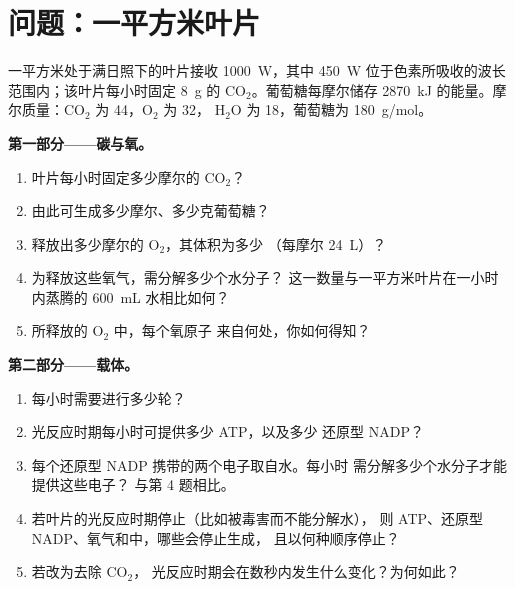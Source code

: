 \section{问题：一平方米叶片}

\begin{problem}
\label{pb:g12:photosynthesis:1}
一平方米处于满日照下的叶片接收 \qty{1000}{W}，其中
\qty{450}{W} 位于色素所吸收的波长范围内；该叶片每小时固定
\qty{8}{g} 的 $\mathrm{CO_2}$。葡萄糖每摩尔储存
\qty{2870}{kJ} 的能量。摩尔质量：$\mathrm{CO_2}$ 为 44，$\mathrm{O_2}$ 为 32，
$\mathrm{H_2O}$ 为 18，葡萄糖为 \qty{180}{g/mol}。

\medskip
\noindent\textbf{第一部分——碳与氧。}
\begin{enumerate}
  \item 叶片每小时固定多少摩尔的 $\mathrm{CO_2}$？
  \item 由此可生成多少摩尔、多少克葡萄糖？
  \item 释放出多少摩尔的 $\mathrm{O_2}$，其体积为多少
        （每摩尔 \qty{24}{L}）？
  \item 为释放这些氧气，需分解多少个水分子？
        这一数量与一平方米叶片在一小时内蒸腾的
        \qty{600}{mL} 水相比如何？
  \item 所释放的 $\mathrm{O_2}$ 中，每个氧原子
        来自何处，你如何得知？
\end{enumerate}

\medskip
\noindent\textbf{第二部分——载体。}
\begin{enumerate}[resume]
  \item 每小时需要进行多少轮？
  \item 光反应时期每小时可提供多少 ATP，以及多少
        还原型 NADP？
  \item 每个还原型 NADP 携带的两个电子取自水。每小时
        需分解多少个水分子才能提供这些电子？
        与第 4 题相比。
  \item 若叶片的光反应时期停止（比如被毒害而不能分解水），
        则 ATP、还原型 NADP、氧气和中，哪些会停止生成，
        且以何种顺序停止？
  \item 若改为去除 $\mathrm{CO_2}$，
        光反应时期会在数秒内发生什么变化？为何如此？
\end{enumerate}


\end{problem}
